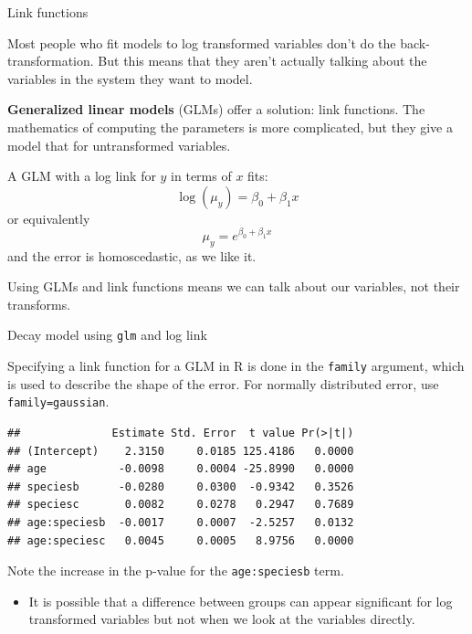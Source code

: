 \documentclass[
  ignorenonframetext,
]{beamer}
\newenvironment{Shaded}{\begin{snugshade}}{\end{snugshade}}
\newcommand{\DataTypeTok}[1]{\textcolor[rgb]{0.13,0.29,0.53}{#1}}
\newcommand{\DecValTok}[1]{\textcolor[rgb]{0.00,0.00,0.81}{#1}}
\newcommand{\KeywordTok}[1]{\textcolor[rgb]{0.13,0.29,0.53}{\textbf{#1}}}
\newcommand{\NormalTok}[1]{#1}
\newcommand{\OperatorTok}[1]{\textcolor[rgb]{0.81,0.36,0.00}{\textbf{#1}}}
\newcommand{\StringTok}[1]{\textcolor[rgb]{0.31,0.60,0.02}{#1}}
\providecommand{\tightlist}{%
  \setlength{\itemsep}{0pt}\setlength{\parskip}{0pt}}
\begin{document}
\begin{frame}{Link functions}
\protect\hypertarget{link-functions}{}

Most people who fit models to log transformed variables don't do the
back-transformation. But this means that they aren't actually talking
about the variables in the system they want to model.

\textbf{Generalized linear models} (GLMs) offer a solution: link
functions. The mathematics of computing the parameters is more
complicated, but they give a model that for untransformed variables.

A GLM with a log link for \(y\) in terms of \(x\) fits: \[
\log(\mu_y)=\beta_0+\beta_1x
\] or equivalently \[
\mu_y=e^{\beta_0+\beta_1x}
\] and the error is homoscedastic, as we like it.

Using GLMs and link functions means we can talk about our variables, not
their transforms.

\end{frame}

\begin{frame}[fragile]{Decay model using \texttt{glm} and log link}
\protect\hypertarget{decay-model-using-glm-and-log-link}{}

Specifying a link function for a GLM in R is done in the \texttt{family}
argument, which is used to describe the shape of the error. For normally
distributed error, use \texttt{family=gaussian}.

\scriptsize

\begin{Shaded}
\end{Shaded}

\begin{verbatim}
##              Estimate Std. Error  t value Pr(>|t|)
## (Intercept)    2.3150     0.0185 125.4186   0.0000
## age           -0.0098     0.0004 -25.8990   0.0000
## speciesb      -0.0280     0.0300  -0.9342   0.3526
## speciesc       0.0082     0.0278   0.2947   0.7689
## age:speciesb  -0.0017     0.0007  -2.5257   0.0132
## age:speciesc   0.0045     0.0005   8.9756   0.0000
\end{verbatim}

\normalsize

Note the increase in the p-value for the \texttt{age:speciesb} term.

\begin{itemize}
\tightlist
\item
  It is possible that a difference between groups can appear significant
  for log transformed variables but not when we look at the variables
  directly.
\end{itemize}

\end{frame}
\end{document}
